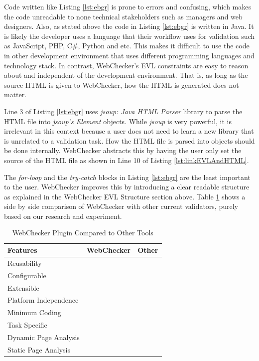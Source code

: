 \documentclass[conference]{IEEETran}
\begin{document}
Code written like Listing \ref{lst:ebgr} is prone to errors and confusing, which makes the code unreadable to none technical stakeholders such as managers and web designers. Also, as stated above the code in Listing  \ref{lst:ebgr}  is written in Java. It is likely the developer uses a language that their workflow uses for validation such as JavaScript, PHP, C\#, Python and etc. This makes it difficult to use the code in other development environment that uses different programming languages and technology stack. In contrast, WebChecker's EVL constraints are easy to reason about and independent of the development environment. That is, as long as the source HTML is given to WebChecker, how the HTML is generated does not matter. 

Line 3 of Listing \ref{lst:ebgr} uses \textit{jsoup: Java HTML Parser}\cite{jsoup} library to parse the HTML file into \textit{jsoup's Element} objects. While \textit{jsoup} is very powerful, it is irrelevant in this context because a user does not need to learn a new library that is unrelated to a validation task. How the HTML file is parsed into objects should be done internally. WebChecker abstracts this by having the user only set the source of the HTML file as shown in Line 10 of Listing \ref{lst:linkEVLAndHTML}.           


The \textit{for-loop} and the \textit{try-catch} blocks in Listing \ref{lst:ebgr} are the least important to the user. WebChecker improves this by introducing a clear readable structure as explained in the WebChecker EVL Structure section above. Table \ref{table:compareWebChecker} shows a side by side comparison of WebChecker with other current validators, purely based on our research and experiment.    
 
\begin{table}[H]
\begin{tabular}{|l|c|c|}
\hline
\textbf{Features}   	 & \textbf{WebChecker} 	& \textbf{Other} \\ \hline
Reusability 	 & \checkmark   	&       \\ \hline
Configurable      & \checkmark        			&       \\ \hline
Extensible        &    \checkmark        			&       \\ \hline
Platform Independence        &    \checkmark        			&       \\ \hline
Minimum Coding        &    \checkmark        			&       \\ \hline	
Task Specific       &    \checkmark        			&       \\ \hline
Dynamic Page Analysis       &    \checkmark        			&       \\ \hline
Static Page Analysis       &    \checkmark        			& \checkmark      \\ \hline	
\end{tabular}
\caption{WebChecker Plugin Compared to Other Tools}
\label{table:compareWebChecker}
\end{table}
\end{document}
